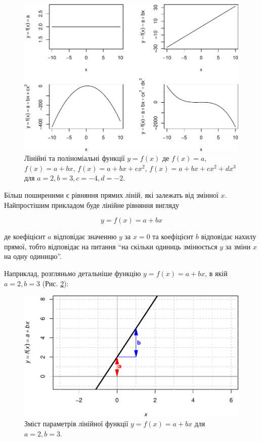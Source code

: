 \documentclass[
  11pt,
]{book}
\begin{document}
\begin{figure}
\centering
\includegraphics{bookdown-demo_files/figure-latex/fig-3-1-1.pdf}
\caption{\label{fig:fig-3-1}Лінійні та поліноміальні функції \(y = f(x)\) де \(f(x) = a\), \(f(x) = a + bx\), \(f(x) = a + bx + cx^2\), \(f(x) = a + bx + cx^2 + dx^3\) для \(a=2, b = 3, c = -4, d = -2\).}
\end{figure}

Більш поширеними є рівняння прямих ліній, які залежать від змінної \(x\). Найпростішим прикладом буде лінійне рівняння вигляду

\[y = f(x) = a + bx\]

де коефіцієнт \(a\) відповідає значенню \(y\) за \(x = 0\) та коефіцієнт \(b\) відповідає нахилу прямої, тобто відповідає на питання ``на скільки одиниць змінюється \(y\) за зміни \(x\) на одну одиницю''.

Наприклад, розгляньмо детальніше функцію \(y = f(x) = a + bx\), в якій \(a = 2, b = 3\) (Рис. \ref{fig:fig-3-2}):

\begin{figure}
\centering
\includegraphics{bookdown-demo_files/figure-latex/fig-3-2-1.pdf}
\caption{\label{fig:fig-3-2}Зміст параметрів лінійної функції \(y = f(x) = a + bx\) для \(a=2, b = 3\).}
\end{figure}
\end{document}
